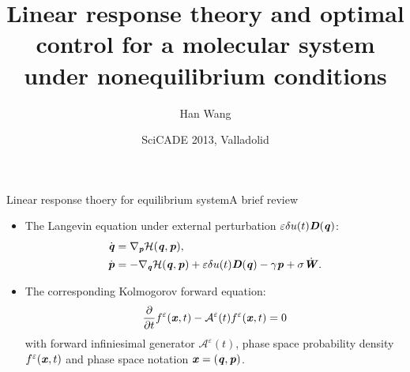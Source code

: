 \documentclass[fleqn]{beamer}
\newcommand{\bluec}[1]{{\color{blue} #1}}
\newcommand{\vect}[1]{\textbf{\textit{#1}}}
\newcommand{\fe}{u}
\newcommand{\mh}{\mathcal H}
\newcommand{\eps}{\varepsilon}
\newcommand{\fwg}{{\mathcal A}}
\begin{document}
\title[Response theory for nonequilibrium MD]{
  Linear response theory and optimal control for a molecular system under nonequilibrium conditions
}
%
\author{Han Wang}
\date[Sept. 2013]{SciCADE 2013, Valladolid}

\frame{\titlepage}

\begin{frame}{Linear response thoery for equilibrium system}{A brief review}
  \begin{itemize}
  \item <1->
    The Langevin equation under external perturbation
    \bluec{$\eps \delta\fe(t) \vect D(\vect q)$}:
    \bluec{
      \begin{align*}
        \dot{\vect q} & = \nabla_{\vect p}\mh(\vect q,\vect p), \\
        \dot{\vect p} & =- \nabla_{\vect q}\mh(\vect q,\vect p)
        + \eps \delta\fe(t) \vect D(\vect q) 
        - \gamma\vect p
        + \sigma\dot{\vect W}.
      \end{align*}
    }
  \item <2->
    The corresponding Kolmogorov forward equation:
    \bluec{
      \begin{align*}
        \frac{\partial}{\partial t} f^\eps(\vect x, t) - \fwg^\eps(t) f^\eps(\vect x, t) = 0
      \end{align*}
    }
    with forward infiniesimal generator \bluec{$\fwg^\eps (t)$}, phase space
    probability density \bluec{$f^\eps(\vect x, t)$} and phase space notation
    \bluec{$\vect x  = (\vect q, \vect p)$}.
  \end{itemize}
\end{frame}
\end{document}
